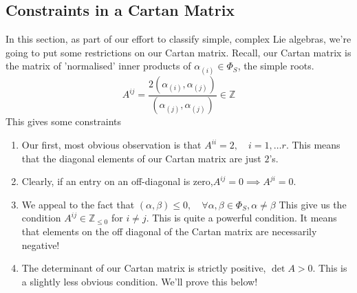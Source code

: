 \subsection{Constraints in a Cartan Matrix}
In this section, as part of our effort 
to classify simple, complex Lie algebras, we're
going to put some restrictions on our Cartan matrix. 
Recall, our Cartan matrix is 
the matrix of 'normalised' inner products of $ \alpha _{ \left( i  \right)  } \in \Phi  _ S$, 
the simple roots. 
\[
A ^{ ij }  = \frac{ 2 \left(  \alpha_{ \left( i  \right)  } ,  \alpha _{ \left( j  \right)  } \right) }{
\left( \alpha _{ \left( j   \right)  } , \alpha _{ \left( j  \right)  } \right)  } \in \mathbb{ Z} 
\] This gives some constraints 
\begin{enumerate}
\item  Our first, most obvious observation is that $ A ^{ i i }  = 2 , \quad i = 1 , \dots r $. 
	This means that the diagonal elements of our Cartan matrix 
	are just $2 $'s. 
\item Clearly, if an entry on an off-diagonal is zero,$ A ^{ ij }  = 0 \implies A ^{ ji }  =0 $.
\item We appeal to the fact that $ \left( \alpha, \beta  \right)  \leq 0 , \quad \forall \alpha, \beta \in \Phi  _ S , \alpha \neq \beta $		This give us the condition $ A ^{ ij } \in \mathbb{ Z} _{ \leq 0 } $ for $ i \neq j $. This is quite a powerful 
	condition. It means that elements on the off diagonal of 
	the Cartan matrix are necessarily negative!
\item  The determinant of our Cartan matrix is strictly positive, $ \det A > 0 $. This is a slightly less obvious condition. We'll prove this below!  
\end{enumerate}

